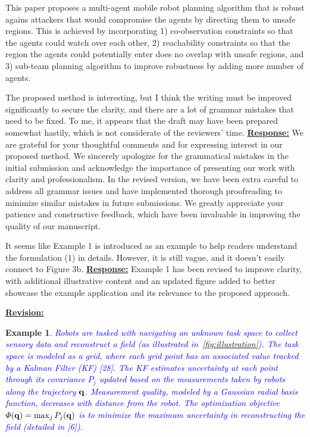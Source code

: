 \documentclass{article}
\newtheorem{example}{Example}
\newcommand{\rv}{{\large{\underline{\textbf{Revision:}}}}\quad}
\newcommand{\new}[1]{\textcolor{blue}{#1}}
\begin{document}
\begin{cmt*}{}{}

	This paper proposes a multi-agent mobile robot planning algorithm that
	is robust agains attackers that would compromise the agents by
	directing them to unsafe regions. This is achieved by incorporating 1)
	co-observation constraints so that the agents could watch over each
	other, 2) reachability constraints so that the region the agents could
	potentially enter does no overlap with unsafe regions, and 3) sub-team
	planning algorithm to improve robustness by adding more number of
	agents.
	
	The proposed method is interesting, but I think the writing must be
	improved significantly to secure the clarity, and there are a lot of
	grammar mistakes that need to be fixed. To me, it appears that the
	draft may have been prepared somewhat hastily, which is not considerate
	of the reviewers' time.
	\tcblower
	\underline{\textbf{Response:}} We are grateful for your thoughtful comments and for expressing interest in our proposed method. We sincerely apologize for the grammatical mistakes in the initial submission and acknowledge the importance of presenting our work with clarity and professionalism. In the revised version, we have been extra careful to address all grammar issues and have implemented thorough proofreading to minimize similar mistakes in future submissions. We greatly appreciate your patience and constructive feedback, which have been invaluable in improving the quality of our manuscript.

\end{cmt*}
\vspace{0.1cm}
\begin{cmt}{}{}        %
	It seems like Example 1 is introduced as an example to help
	readers understand the formulation (1) in details. However, it is still
	vague, and it doesn't easily connect to Figure 3b.
	\tcblower
	\underline{\textbf{Response:}} Example 1 has been revised to improve clarity, with additional illustrative content and an updated figure added to better showcase the example application and its relevance to the proposed approach.
\end{cmt}
\rv
\begin{example}\label{example:map_exploration}
\new{Robots are tasked with navigating an unknown task space to collect sensory data and reconstruct a field (as illustrated in~\cref{fig:illustration}). The task space is modeled as a grid, where each grid point has an associated value tracked by a Kalman Filter (KF) [28]. The KF estimates uncertainty at each point through its covariance $P_j$ updated based on the measurements taken by robots along the trajectory $\mathbf{q}$. Measurement quality, modeled by a Gaussian radial basis function, decreases with distance from the robot. The optimization objective $\varPhi(\mathbf{q})=\max_j P_j(\mathbf{q})$ is to minimize the maximum uncertainty in reconstructing the field (detailed in [6]). }
\end{example}
\end{document}
